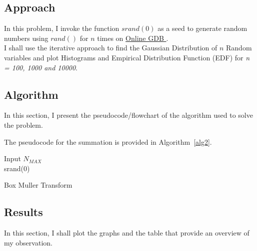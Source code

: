 \documentclass[titlepage, 11pt]{article}
\begin{document}
\subsection{Approach}

In this problem, I invoke the function $srand(0)$ as a seed to generate random numbers using $rand()$ for $n$ times on \href{https://www.onlinegdb.com/online_c_compiler}{Online GDB }. \\
I shall use the iterative approach to find the Gaussian Distribution of $n$ Random variables and plot Histograms and Empirical Distribution Function (EDF) for \emph{n = 100, 1000 and 10000}. \\ 

\subsection{Algorithm}
In this section, I present the pseudocode/flowchart of the algorithm used to solve the problem.

The pseudocode for the summation is provided in Algorithm~\ref{alg2}.
\begin{center}
\begin{algorithm}[H]\label{alg2}

\SetAlgoLined

Input $N_{MAX}$ \\
srand(0) \\

 \caption{Box Muller Transform}
\end{algorithm}    
\end{center}

\subsection{Results}
In this section, I shall plot the graphs and the table that provide an overview of my observation. \\
\end{document}

